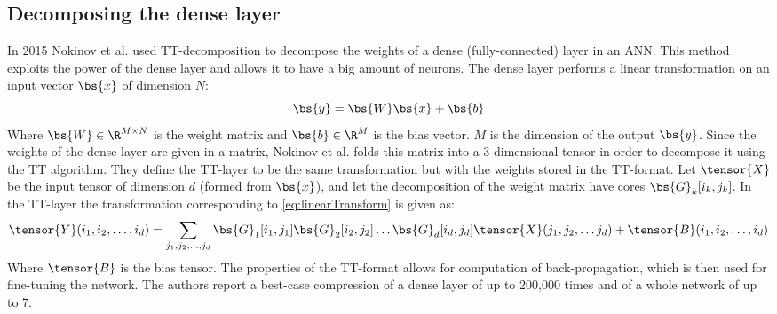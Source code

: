 \subsection{Decomposing the dense layer}
In 2015 Nokinov et al. used TT-decomposition to decompose the weights of a dense (fully-connected) layer in an ANN\cite{Novikov2015}. This method exploits the power of the dense layer and allows it to have a big amount of neurons. The dense layer performs a linear transformation on an input vector $\bs{x}$ of dimension $N$:
\begin{equation}
    \bs{y} = \bs{W} \bs{x} + \bs{b}
    \label{eq:linearTransform}
\end{equation}
Where $\bs{W} \in \R^{M\times N}$ is the weight matrix and $\bs{b} \in \R^{M}$ is the bias vector. $M$ is the dimension of the output $\bs{y}$. Since the weights of the dense layer are given in a matrix, Nokinov et al. folds this matrix into a 3-dimensional tensor in order to decompose it using the TT algorithm. They define the TT-layer to be the same transformation but with the weights stored in the TT-format. Let $\tensor{X}$ be the input tensor of dimension $d$ (formed from $\bs{x}$), and let the decomposition of the weight matrix have cores $\bs{G}_k[i_k, j_k]$. In the TT-layer the transformation corresponding to \eqref{eq:linearTransform} is given as:
\begin{equation}
    \tensor{Y}(i_1, i_2, \dots, i_d) = \sum_{j_1, j_2, \dots, j_d} \bs{G}_1[i_1, j_1] \bs{G}_2[i_2, j_2]\dots \bs{G}_d[i_d, j_d] \tensor{X}(j_1, j_2, \dots j_d) + \tensor{B}(i_1, i_2, \dots, i_d)
\end{equation}
Where $\tensor{B}$ is the bias tensor. The properties of the TT-format allows for computation of back-propagation, which is then used for fine-tuning the network. The authors report a best-case compression of a dense layer of up to 200,000 times and of a whole network of up to 7.

